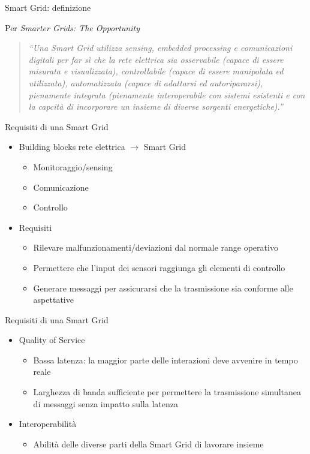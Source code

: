 \begin{frame}{Smart Grid: definizione}
\begin{block}{Per \textit{Smarter Grids: The Opportunity}}
\begin{quote}
\textit{``Una Smart Grid utilizza sensing, embedded processing e comunicazioni digitali per far sì che la rete elettrica sia osservabile (capace di essere misurata e visualizzata), controllabile (capace di essere manipolata ed utilizzata), automatizzata (capace di adattarsi ed autoripararsi), pienamente integrata (pienamente interoperabile con sistemi esistenti e con la capcità di incorporare un insieme di diverse sorgenti energetiche).”}
\end{quote}
\end{block}
\end{frame}

\begin{frame}{Requisiti di una Smart Grid}
\begin{itemize}[<+- | alert@+>]
\item Building blocks rete elettrica $\rightarrow$ Smart Grid
\begin{itemize}
	\item Monitoraggio/sensing
	\item Comunicazione
	\item Controllo
\end{itemize}
\item Requisiti
\begin{itemize}
\item Rilevare malfunzionamenti/deviazioni dal normale range operativo
\item Permettere che l’input dei sensori raggiunga gli elementi di controllo
\item Generare messaggi per assicurarsi che la trasmissione sia conforme alle aspettative
\end{itemize}
\end{itemize}
\end{frame}


\begin{frame}{Requisiti di una Smart Grid}
\begin{itemize}[<+- | alert@+>]
\item Quality of Service
	\begin{itemize}
		\item Bassa latenza: la maggior parte delle interazioni deve avvenire in tempo reale
		\item Larghezza di banda sufficiente per permettere la trasmissione simultanea di messaggi senza impatto sulla latenza
	\end{itemize}
\item Interoperabilità
	\begin{itemize}
		\item Abilità delle diverse parti della Smart Grid di lavorare insieme
	\end{itemize}
\end{itemize}
\end{frame}

